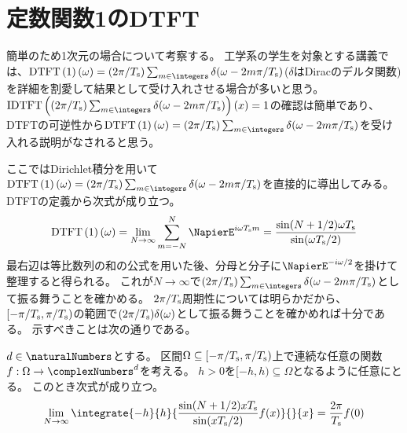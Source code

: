     \section{定数関数1のDTFT}
        \label{定数関数1のDTFT}
        簡単のため1次元の場合について考察する。
        工学系の学生を対象とする講義では、$\DTFTwithArg{1}{\omega} = (2\pi/\Tsamp)\sum_{m\in\integers}\delta(\omega-2m\pi/\Tsamp)$($\delta$はDiracのデルタ関数)を詳細を割愛して結果として受け入れさせる場合が多いと思う。
        $\IDTFTwithArg{(2\pi/\Tsamp)\sum_{m\in\integers}\delta(\omega-2m\pi/\Tsamp)}{x}=1$の確認は簡単であり、DTFTの可逆性から$\DTFTwithArg{1}{\omega} = (2\pi/\Tsamp)\sum_{m\in\integers}\delta(\omega-2m\pi/\Tsamp)$を受け入れる説明がなされると思う。
        \par
        ここではDirichlet積分を用いて$\DTFTwithArg{1}{\omega} = (2\pi/\Tsamp)\sum_{m\in\integers}\delta(\omega-2m\pi/\Tsamp)$を直接的に導出してみる。
        DTFTの定義から次式が成り立つ。
        \[
            \DTFTwithArg{1}{\omega} = \lim_{N\to\infty} \sum_{m=-N}^N \NapierE^{i\omega \Tsamp m} = \frac{\sin(N+1/2)\omega \Tsamp}{\sin(\omega \Tsamp/2)}
        \]
        最右辺は等比数列の和の公式を用いた後、分母と分子に$\NapierE^{-i\omega/2}$を掛けて整理すると得られる。
        これが$N\to\infty$で$(2\pi/\Tsamp)\sum_{m\in\integers}\delta(\omega-2m\pi/\Tsamp)$として振る舞うことを確かめる。
        $2\pi/T_\text{s}$周期性については明らかだから、$[-\pi/T_\text{s},\pi/T_\text{s})$の範囲で$(2\pi/T_\text{s})\delta(\omega)$として振る舞うことを確かめれば十分である。
        示すべきことは次の通りである。
        \begin{shadebox}
            $d\in\naturalNumbers$とする。
            区間$\Omega \subseteq [-\pi/T_\text{s},\pi/T_\text{s})$上で連続な任意の関数$f:\Omega\to\complexNumbers^d$を考える。
            $h>0$を$[-h,h) \subseteq \Omega$となるように任意にとる。
            このとき次式が成り立つ。
            \[
                \lim_{N\to\infty} \integrate{-h}{h}{\frac{\sin(N+1/2)x \Tsamp}{\sin(x \Tsamp/2)} f(x)}{}{x} = \frac{2\pi}{\Tsamp} f(0)
            \]
        \end{shadebox}
